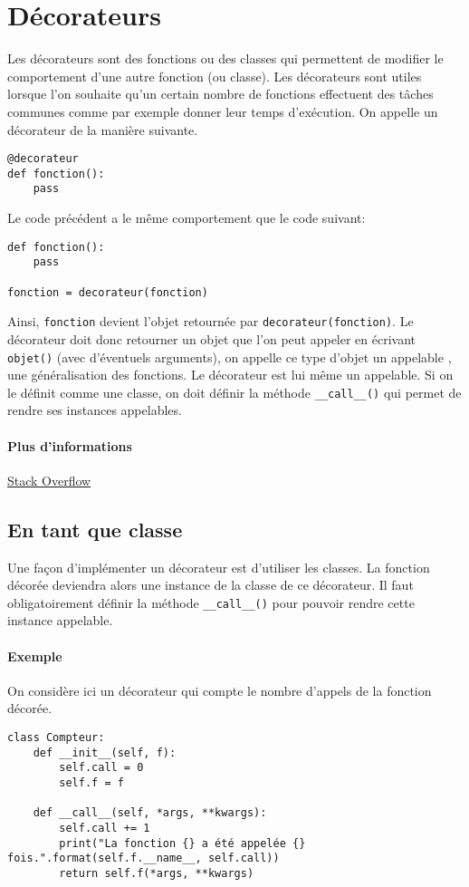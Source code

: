 \section{Décorateurs}
Les décorateurs sont des fonctions ou des classes qui permettent de modifier le comportement d'une autre fonction (ou classe). Les décorateurs sont utiles lorsque l'on souhaite qu'un certain nombre de fonctions effectuent des tâches communes comme par exemple donner leur temps d'exécution. On appelle un décorateur de la manière suivante.

\begin{verbatim}
@decorateur
def fonction():
    pass
\end{verbatim}

Le code précédent a le même comportement que le code suivant:

\begin{verbatim}
def fonction():
    pass

fonction = decorateur(fonction)
\end{verbatim}

Ainsi, \texttt{fonction} devient l'objet retournée par \texttt{decorateur(fonction)}. Le décorateur doit donc retourner un objet que l'on peut appeler en écrivant \texttt{objet()} (avec d'éventuels arguments), on appelle ce type d'objet un \og appelable \fg{}, une généralisation des fonctions. Le décorateur est lui même un appelable. Si on le définit comme une classe, on doit définir la méthode \texttt{__call__()} qui permet de rendre ses instances appelables.

\paragraph{Plus d'informations} \href{https://stackoverflow.com/questions/739654/how-to-make-a-chain-of-function-decorators/1594484#1594484}{Stack Overflow}

\subsection{En tant que classe}
Une façon d'implémenter un décorateur est d'utiliser les classes. La fonction décorée deviendra alors une instance de la classe de ce décorateur. Il faut obligatoirement définir la méthode \texttt{__call__()} pour pouvoir rendre cette instance appelable.

\paragraph{Exemple} On considère ici un décorateur qui compte le nombre d'appels de la fonction décorée.
\begin{verbatim}
class Compteur:
    def __init__(self, f):
        self.call = 0
        self.f = f

    def __call__(self, *args, **kwargs):
        self.call += 1
        print("La fonction {} a été appelée {} fois.".format(self.f.__name__, self.call))
        return self.f(*args, **kwargs)
\end{verbatim}


